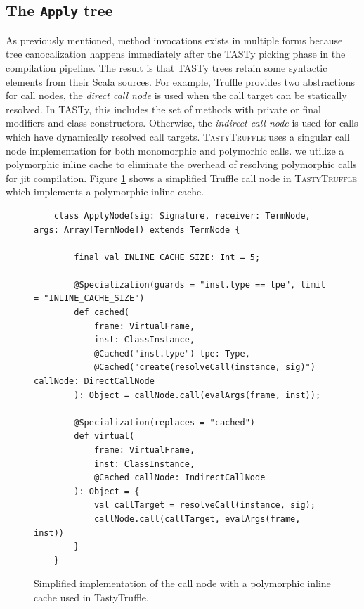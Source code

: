 
\subsection{The \texttt{Apply} tree}


As previously mentioned, method invocations exists in multiple forms because tree canocalization happens immediately after the TASTy picking phase in the compilation pipeline.
The result is that TASTy trees retain some syntactic elements from their Scala sources. 
For example, Truffle provides two abstractions for call nodes, the \textit{direct call node} is used when the call target can be statically resolved. 
In TASTy, this includes the set of methods with private or final modifiers\cite{java:lang-spec} and class constructors. 
Otherwise, the \textit{indirect call node} is used for calls which have dynamically resolved call targets. 
\textsc{TastyTruffle} uses a singular call node implementation for both monomorphic and polymorhic calls. 
we utilize a polymorphic inline cache\cite{self:polymorphic-inline-caches} to eliminate the overhead of resolving polymorphic calls for \acrshort{jit} compilation. 
Figure \ref{implementation:poly-cache-call-node} shows a simplified Truffle call node in \textsc{TastyTruffle} which implements a polymorphic inline cache.

\begin{figure}[!htb]
	\begin{verbatim}
	class ApplyNode(sig: Signature, receiver: TermNode, args: Array[TermNode]) extends TermNode {
		
		final val INLINE_CACHE_SIZE: Int = 5;
		
		@Specialization(guards = "inst.type == tpe", limit = "INLINE_CACHE_SIZE")
		def cached(
			frame: VirtualFrame,
			inst: ClassInstance,
			@Cached("inst.type") tpe: Type,
			@Cached("create(resolveCall(instance, sig)") callNode: DirectCallNode
		): Object = callNode.call(evalArgs(frame, inst));
		
		@Specialization(replaces = "cached")
		def virtual(
			frame: VirtualFrame,
			inst: ClassInstance,
			@Cached callNode: IndirectCallNode
		): Object = {
			val callTarget = resolveCall(instance, sig);
			callNode.call(callTarget, evalArgs(frame, inst))
		}
	}
	\end{verbatim}
	\caption{Simplified implementation of the call node with a polymorphic inline cache used in TastyTruffle.}
	\label{implementation:poly-cache-call-node}
\end{figure}

